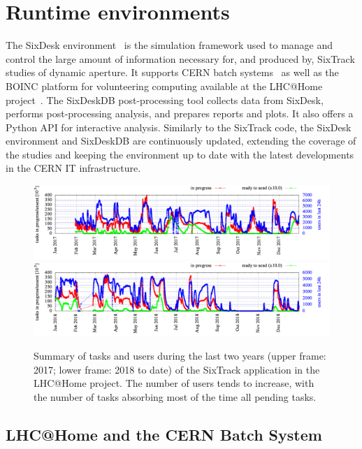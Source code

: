 \documentclass{ws-ijmpa}
\begin{document}
\section{Runtime environments}

The SixDesk environment~\cite{sixdesk} is the simulation framework used to manage and control the large amount of information necessary for, and produced by, SixTrack studies of dynamic aperture. It supports CERN batch systems~\cite{cernbatch} as well as the BOINC platform for volunteering computing available at the LHC@Home project~\cite{lhcathome}. The SixDeskDB post-processing tool collects data from SixDesk, performs post-processing analysis, and prepares reports and plots. It also offers a Python API for interactive analysis. Similarly to the SixTrack code, the SixDesk environment and SixDeskDB are continuously updated, extending the coverage of the studies and keeping the environment up to date with the latest developments in the CERN IT infrastructure.



\begin{figure}[tbh]
\centering
 \includegraphics[width=\textwidth]{sixtrackOverview_2017.png}
 \includegraphics[width=\textwidth]{sixtrackOverview_2018.png}
  \caption{Summary of tasks and users during the last two years (upper frame: 2017; lower frame: 2018 to date) of the SixTrack application in the LHC@Home project. The number of users tends to increase, with the number of tasks absorbing most of the time all pending tasks.}
 \label{fig:boinc}
\end{figure}

\subsection{LHC@Home and the CERN Batch System}
\end{document}
